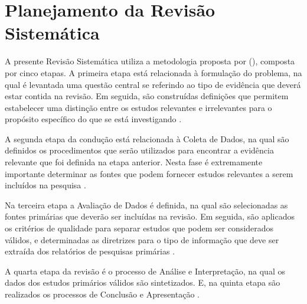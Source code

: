 \documentclass[
	12pt,				%
	oneside,			%
	a4paper,			%
	english,			%
	brazil				%
	]{abntex2ppgsi}
\begin{document}
{{%


\section{Planejamento da Revisão Sistemática}
\label{planejamento}
A presente Revisão Sistemática utiliza a metodologia proposta por \citeauthor{biolchini2005techincal} (\citeyear{biolchini2005techincal}), composta por cinco etapas.
A primeira etapa está relacionada à formulação do problema, na qual é levantada uma questão central se referindo ao tipo de evidência que deverá  estar contida na revisão. Em seguida, são construídas definições que permitem estabelecer uma distinção entre os estudos relevantes e irrelevantes para o propósito específico do que se está investigando \cite{biolchini2005techincal}.

A segunda etapa da condução está relacionada à Coleta de Dados, na qual são definidos os procedimentos que serão utilizados para encontrar a evidência relevante que foi definida na etapa anterior. Nesta fase é extremamente importante determinar as fontes que podem fornecer estudos relevantes a serem incluídos na pesquisa \cite{biolchini2005techincal}.

Na terceira etapa a Avaliação de Dados é definida, na qual são selecionadas as fontes primárias que deverão ser incluídas na revisão. Em seguida,  são aplicados os critérios de qualidade para separar estudos que podem ser considerados válidos, e determinadas as diretrizes para o tipo de informação que deve ser extraída dos relatórios de pesquisas primárias \cite{biolchini2005techincal}.

A quarta etapa da revisão é o processo de Análise e Interpretação, na qual os dados dos estudos primários válidos são sintetizados. E, na quinta etapa são realizados os processos de Conclusão e Apresentação \cite{biolchini2005techincal}.

}}
\end{document}

